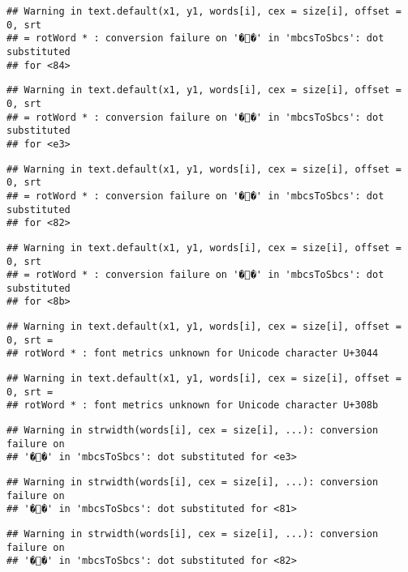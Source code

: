 \documentclass[]{article}
\begin{document}
\begin{verbatim}
## Warning in text.default(x1, y1, words[i], cex = size[i], offset = 0, srt
## = rotWord * : conversion failure on '��' in 'mbcsToSbcs': dot substituted
## for <84>
\end{verbatim}

\begin{verbatim}
## Warning in text.default(x1, y1, words[i], cex = size[i], offset = 0, srt
## = rotWord * : conversion failure on '��' in 'mbcsToSbcs': dot substituted
## for <e3>
\end{verbatim}

\begin{verbatim}
## Warning in text.default(x1, y1, words[i], cex = size[i], offset = 0, srt
## = rotWord * : conversion failure on '��' in 'mbcsToSbcs': dot substituted
## for <82>
\end{verbatim}

\begin{verbatim}
## Warning in text.default(x1, y1, words[i], cex = size[i], offset = 0, srt
## = rotWord * : conversion failure on '��' in 'mbcsToSbcs': dot substituted
## for <8b>
\end{verbatim}

\begin{verbatim}
## Warning in text.default(x1, y1, words[i], cex = size[i], offset = 0, srt =
## rotWord * : font metrics unknown for Unicode character U+3044
\end{verbatim}

\begin{verbatim}
## Warning in text.default(x1, y1, words[i], cex = size[i], offset = 0, srt =
## rotWord * : font metrics unknown for Unicode character U+308b
\end{verbatim}

\begin{verbatim}
## Warning in strwidth(words[i], cex = size[i], ...): conversion failure on
## '��' in 'mbcsToSbcs': dot substituted for <e3>
\end{verbatim}

\begin{verbatim}
## Warning in strwidth(words[i], cex = size[i], ...): conversion failure on
## '��' in 'mbcsToSbcs': dot substituted for <81>
\end{verbatim}

\begin{verbatim}
## Warning in strwidth(words[i], cex = size[i], ...): conversion failure on
## '��' in 'mbcsToSbcs': dot substituted for <82>
\end{verbatim}
\end{document}
